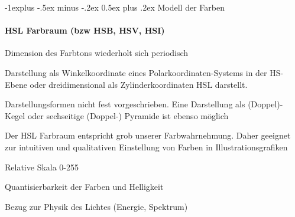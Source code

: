 \documentclass[landscape]{article}
\makeatletter
\renewcommand{\subsection}{\@startsection{subsection}{2}{0mm}%
                                {-1explus -.5ex minus -.2ex}%
                                {0.5ex plus .2ex}%
                                {\normalfont\normalsize\bfseries}}
\makeatother
\begin{document}
\begin{multicols}{3}
  \subsection{Modell der Farben}
  \paragraph{HSL Farbraum (bzw HSB, HSV, HSI)}
  \begin{itemize*}
    \item Dimension des Farbtons wiederholt sich periodisch
    \item Darstellung als Winkelkoordinate eines Polarkoordinaten-Systems in der HS-Ebene oder dreidimensional als Zylinderkoordinaten HSL darstellt.
    \item Darstellungsformen nicht fest vorgeschrieben. Eine Darstellung als (Doppel)-Kegel oder sechseitige (Doppel-) Pyramide ist ebenso möglich
    \item Der HSL Farbraum entspricht grob unserer Farbwahrnehmung. Daher geeignet zur intuitiven und qualitativen Einstellung von Farben in Illustrationsgrafiken
    \item Relative Skala 0-255
    \item Quantisierbarkeit der Farben und Helligkeit
    \item Bezug zur Physik des Lichtes (Energie, Spektrum)
  \end{itemize*}
  

\end{multicols}
\end{document}
